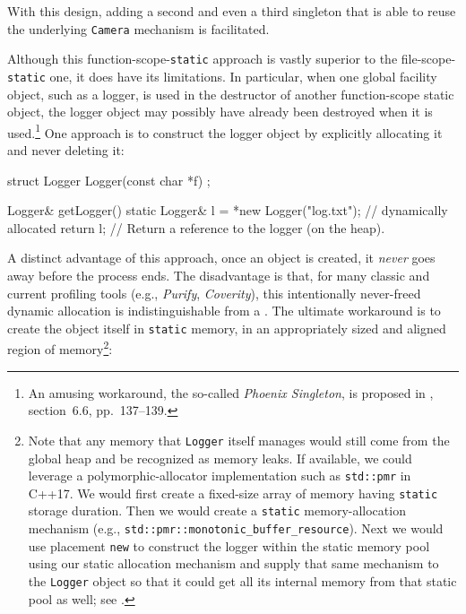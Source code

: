 \noindent With this design, adding a second and even a third singleton that is
able to reuse the underlying \lstinline!Camera! mechanism is facilitated.

Although this function-scope-\lstinline!static! approach is vastly superior
to the file-scope-\lstinline!static! one, it does have its limitations. In
particular, when one global facility object, such as a logger, is used
in the destructor of another function-scope static object, the logger
object may possibly have already been destroyed when it is
used.\footnote{An amusing workaround, the so-called \emph{Phoenix
Singleton}, is proposed in \cite{alexandrescu01}, section~6.6, pp.~137--139.} One approach is to construct the logger object by
explicitly allocating it and never deleting it:

\begin{emcppshiddenlisting}[emcppsbatch={e12,e13,e16,e17}]
struct Logger {
  Logger(const char *f) {}
};
\end{emcppshiddenlisting}
\begin{emcppslisting}[emcppsbatch=e12]
Logger& getLogger()
{
    static Logger& l = *new Logger("log.txt");  // dynamically allocated
    return l;  // Return a reference to the logger (on the heap).
}
\end{emcppslisting}

\noindent A distinct advantage of this approach, once an object is created, it
\emph{never} goes away before the process ends. The disadvantage is
that, for many classic and current profiling tools (e.g., \emph{Purify},
\emph{Coverity}), this intentionally never-freed dynamic allocation is
indistinguishable from a . The ultimate workaround
is to create the object itself in \lstinline!static! memory, in an
appropriately sized and aligned region of memory{\cprotect\footnote{Note
that any memory that \lstinline!Logger! itself manages would still come
from the global heap and be recognized as memory leaks. If available,
we could leverage a polymorphic-allocator implementation such as
\lstinline!std::pmr! in C++17. We would first create a fixed-size array
of memory having \lstinline!static! storage duration. Then we would
create a \lstinline!static! memory-allocation mechanism (e.g.,
\lstinline!std::pmr::monotonic_buffer_resource!). Next we would use
placement \lstinline!new! to construct the logger within the static
memory pool using our static allocation mechanism and supply that same
mechanism to the \lstinline!Logger! object so that it could get all its
  internal memory from that static pool as well; see \cite{lakos22}.}}:


